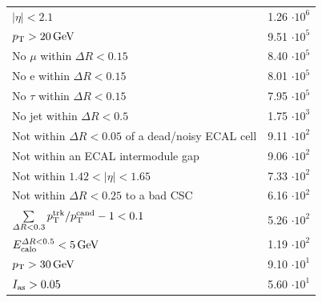 \begin{table}[!h]
{\begin{tabular}{|l|c|}
$|\eta|<2.1$                                                                              & 1.26 $\cdot10^{6 }$ \\
$p_{\text{T}}>20\,\text{Ge}\kern-0.06667em\text{V}$                                                                              & 9.51 $\cdot10^{5 }$ \\
No $\mu$ within $\Delta R<0.15$                                                           & 8.40 $\cdot10^{5 }$ \\
No e within $\Delta R<0.15$                                                               & 8.01 $\cdot10^{5 }$ \\
No $\tau$ within $\Delta R<0.15$                                                          & 7.95 $\cdot10^{5 }$ \\
No jet within $\Delta R<0.5$                                                              & 1.75 $\cdot10^{3 }$ \\
\makecell[l]{Not within $\Delta R<0.05$ of \\\hfill a dead/noisy ECAL cell}               & 9.11 $\cdot10^{2 }$ \\
Not within an ECAL  intermodule gap                                                       & 9.06 $\cdot10^{2 }$ \\
Not within $1.42<|\eta|<1.65$                                                             & 7.33 $\cdot10^{2 }$ \\
Not within $\Delta R<0.25$ to a bad CSC                                                   & 6.16 $\cdot10^{2 }$ \\
$\sum \limits_{\Delta R < 0.3} p_{\text{T}}^{\text{trk}}/p_{\text{T}}^{\text{cand}} -1 < 0.1$                         & 5.26 $\cdot10^{2 }$ \\
$E^{\Delta R<0.5}_{\text{calo}}<5\,\text{Ge}\kern-0.06667em\text{V}$                                                                            & 1.19 $\cdot10^{2 }$ \\
\midrule
$p_{\text{T}}>30\,\text{Ge}\kern-0.06667em\text{V}$                                                                              & 9.10 $\cdot10^{1 }$ \\
$I_{\text{as}}>0.05$                                                                               & 5.60 $\cdot10^{1 }$ \\
\bottomrule
\end{tabular}}
\end{table}  


\clearpage
